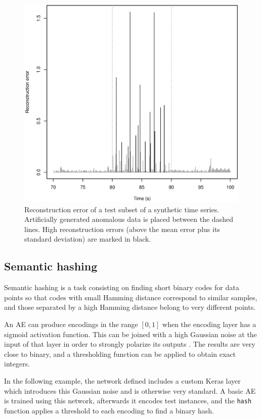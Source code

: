 \begin{figure}[ht]
    \centering
    \includegraphics[width=.75\textwidth]{anomaly_detection_lorenz.eps}
    \caption{Reconstruction error of a test subset of a synthetic time series. Artificially generated anomalous data is placed between the dashed lines. High reconstruction errors (above the mean error plus its standard deviation) are marked in black.}
    \label{p4fig:anomaly}
\end{figure}

\subsection{Semantic hashing}
\label{p4sec.hashing}

Semantic hashing \cite{hinton} is a task consisting on finding short binary codes for data points so that codes with small Hamming distance correspond to similar samples, and those separated by a high Hamming distance belong to very different points.

An AE can produce encodings in the range $[0,1]$ when the encoding layer has a sigmoid activation function. This can be joined with a high Gaussian noise at the input of that layer in order to strongly polarize its outputs \cite{hinton}. The results are very close to binary, and a thresholding function can be applied to obtain exact integers.

In the following example, the network defined includes a custom Keras layer which introduces this Gaussian noise and is otherwise very standard. A basic AE is trained using this network, afterwards it encodes test instances, and the \texttt{hash} function applies a threshold to each encoding to find a binary hash.

